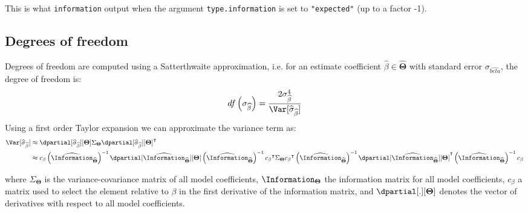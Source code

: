 \documentclass[12pt]{article}
\newcommand\trans[1]{{#1}^\intercal}%
\newcommand{\param}{\Theta}
\newcommand{\Vparam}{\boldsymbol{\param}}
\begin{document}
This is what \texttt{information} output when the argument \texttt{type.information}
is set to \texttt{"expected"} (up to a factor -1).

\clearpage

\subsection{Degrees of freedom}
\label{sec:org81b5baa}

Degrees of freedom are computed using a Satterthwaite approximation,
i.e. for an estimate coefficient \(\widehat{\beta}\in\widehat{\Vparam}\) with standard
error \(\sigma_{\widehat{beta}}\), the degree of freedom is:
\begin{align*}
df\left(\sigma_{\widehat{\beta}}\right) = \frac{2 \sigma^4_{\widehat{\beta}}}{\Var[\widehat{\sigma}_{\widehat{\beta}}]}
\end{align*}
Using a first order Taylor expansion we can approximate the variance term as:
\begin{align*}
\Var[\widehat{\sigma}_{\widehat{\beta}}] & \approx \dpartial[\widehat{\sigma}_{\widehat{\beta}}][\Vparam] \Sigma_{\Vparam}  \trans{\dpartial[\widehat{\sigma}_{\widehat{\beta}}][\Vparam]} \\
& \approx c_{\beta} \left(\widehat{\Information}_{\widehat{\Vparam}}\right)^{-1} \dpartial[\widehat{\Information}_{\widehat{\Vparam}}][\Vparam] \left(\widehat{\Information}_{\widehat{\Vparam}}\right)^{-1} \trans{c_{\beta}} \Sigma_{\Vparam} \trans{c_{\beta}} \left(\widehat{\Information}_{\widehat{\Vparam}}\right)^{-1} \trans{\dpartial[\widehat{\Information}_{\widehat{\Vparam}}][\Vparam]} \left(\widehat{\Information}_{\widehat{\Vparam}}\right)^{-1} c_{\beta}
\end{align*}

where \(\Sigma_{\Vparam}\) is the variance-covariance matrix of all
model coefficients, \(\Information_{\Vparam}\) the information
matrix for all model coefficients, \(c_{\beta}\) a matrix used to
select the element relative to \(\beta\) in the first derivative of
the information matrix, and \(\dpartial[.][\Vparam]\) denotes the
vector of derivatives with respect to all model coefficients.

\bigskip
\end{document}
